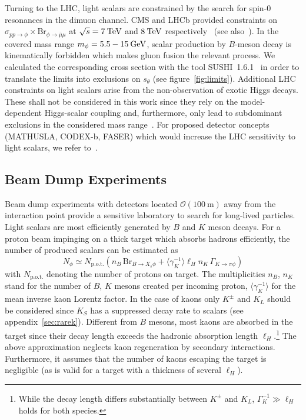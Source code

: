\documentclass[preprintnumbers,twocolumn,aps,floats,nofootinbib]{revtex4-1}
\newcommand{\eVdist}{\kern-0.06em}
\newcommand{\gev}{\:\text{Ge\eVdist V}}
\newcommand{\tev}{\:\text{Te\eVdist V}}
\begin{document}
Turning to the LHC, light scalars are constrained by the search for spin-0 resonances in the dimuon channel. CMS and LHCb provided constraints on $\sigma_{pp\rightarrow\phi} \times \text{Br}_{\phi\rightarrow\bar{\mu}\mu}$ at $\sqrt{s}=7\tev$ and $8\tev$ respectively~\cite{Chatrchyan:2012am,Aaij:2018xpt} (see also~\cite{Haisch:2016hzu}). In the covered mass range $m_\phi=5.5-15\gev$, scalar production by $B$-meson decay is kinematically forbidden which makes gluon fusion the relevant process. We calculated the corresponding cross section with the tool SUSHI~1.6.1~\cite{Harlander:2012pb} in order to translate the limits into exclusions on $s_\theta$ (see figure~\ref{fig:limits}). Additional LHC constraints on light scalars arise from the non-observation of exotic Higgs decays. These shall not be considered in this work since they rely on the model-dependent Higgs-scalar coupling and, furthermore, only lead to subdominant exclusions in the considered mass range~\cite{Flacke:2016szy}. For proposed detector concepts (MATHUSLA, CODEX-b, FASER) which would increase the LHC sensitivity to light scalars, we refer to~\cite{Evans:2017lvd,Feng:2017vli,Evans:2017kti}.



\subsection{Beam Dump Experiments}
Beam dump experiments with detectors located $\mathcal{O}(100\:\text{m})$ away from the interaction point provide a sensitive laboratory to search for long-lived particles. Light scalars are most efficiently generated by $B$ and $K$ meson decays. For a proton beam impinging on a thick target which absorbs hadrons efficiently, the number of produced scalars can be estimated as
\begin{equation}
 N_\phi \simeq N_{\text{p.o.t.}}\! \left(n_B\,\text{Br}_{B\rightarrow X_s \phi} + \langle \gamma_K^{-1}\rangle \ell_H n_K\, \Gamma_{K\rightarrow \pi\phi}\right)
\end{equation}
with $N_{\text{p.o.t.}}$ denoting the number of protons on target. The multiplicities $n_B$, $n_K$ stand for the number of $B$, $K$ mesons created per incoming proton, $\langle\gamma_K^{-1}\rangle$ for the mean inverse kaon Lorentz factor. In the case of kaons only $K^\pm$ and $K_L$ should be considered since $K_S$ has a suppressed decay rate to scalars (see appendix~\ref{sec:rarek}). Different from $B$ mesons, most kaons are absorbed in the target since their decay length exceeds the hadronic absorption length $\ell_H$.\footnote{While the decay length differs substantially between $K^\pm$ and $K_L$, $\Gamma_K^{-1}\gg \ell_H$ holds for both species.} The above approximation neglects kaon regeneration by secondary interactions. Furthermore, it assumes that the number of kaons escaping the target is negligible (as is valid for a target with a thickness of several $\ell_H$). 
\end{document}
